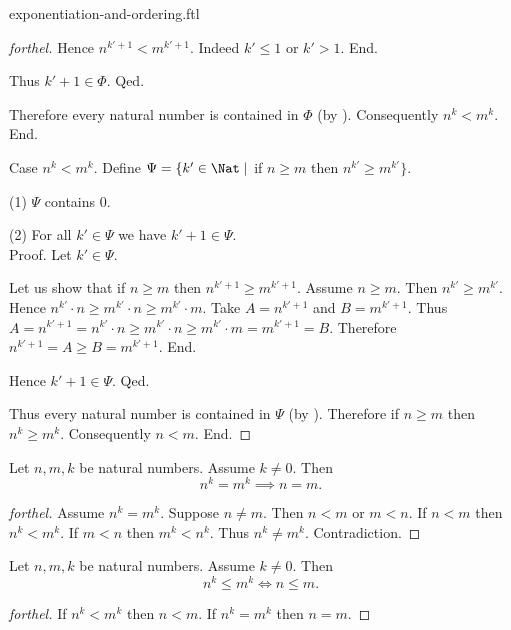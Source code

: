 \documentclass{naproche-library}
\begin{document}
\begin{smodule}{exponentiation-and-ordering.ftl}
\begin{proof}[forthel]
          Hence $n^{k' + 1} < m^{k' + 1}$.
          Indeed $k' \leq 1$ or $k' > 1$.
        End.

        Thus $k' + 1 \in \Phi$.
      Qed.

      Therefore every natural number is contained in $\Phi$ (by ).
      Consequently $n^{k} < m^{k}$.
    End.

    Case $n^{k} < m^{k}$.
      Define $\Psi = \{ k' \in \Nat \mid$ if $n \geq m$ then $n^{k'} \geq m^{k'} \}$.

      (1) $\Psi$ contains $0$.

      (2) For all $k' \in \Psi$ we have $k' + 1 \in \Psi$. \\
      Proof.
        Let $k' \in \Psi$.

        Let us show that if $n \geq m$ then $n^{k' + 1} \geq m^{k' + 1}$.
          Assume $n \geq m$.
          Then $n^{k'} \geq m^{k'}$.
          Hence $n^{k'} \cdot n \geq m^{k'} \cdot n \geq m^{k'} \cdot m$.
          Take $A = n^{k' + 1}$ and $B = m^{k' + 1}$. %
          Thus $A
            = n^{k' + 1}
            = n^{k'} \cdot n
            \geq m^{k'} \cdot n
            \geq m^{k'} \cdot m
            = m^{k' + 1}
            = B$.
          Therefore $n^{k' + 1} = A \geq B = m^{k' + 1}$.
        End.

        Hence $k' + 1 \in \Psi$.
      Qed.

      Thus every natural number is contained in $\Psi$ (by ).
      Therefore if $n \geq m$ then $n^{k} \geq m^{k}$.
      Consequently $n < m$.
    End.
  \end{proof}

  \begin{corollary}[forthel,id=ARITHMETIC_09_2797602550579200]
    Let $n, m, k$ be natural numbers.
    Assume $k \neq 0$.
    Then \[ n^{k} = m^{k} \implies n = m. \]
  \end{corollary}
  \begin{proof}[forthel]
    Assume $n^{k} = m^{k}$.
    Suppose $n \neq m$.
    Then $n < m$ or $m < n$.
    If $n < m$ then $n^{k} < m^{k}$.
    If $m < n$ then $m^{k} < n^{k}$.
    Thus $n^{k} \neq m^{k}$.
    Contradiction.
  \end{proof}

  \begin{corollary}[forthel,id=ARITHMETIC_09_6875081963732992]
    Let $n, m, k$ be natural numbers.
    Assume $k \neq 0$.
    Then \[ n^{k} \leq m^{k} \iff n \leq m. \]
  \end{corollary}
  \begin{proof}[forthel]
    If $n^{k} < m^{k}$ then $n < m$.
    If $n^{k} = m^{k}$ then $n = m$.


\end{proof}
\end{smodule}
\end{document}
